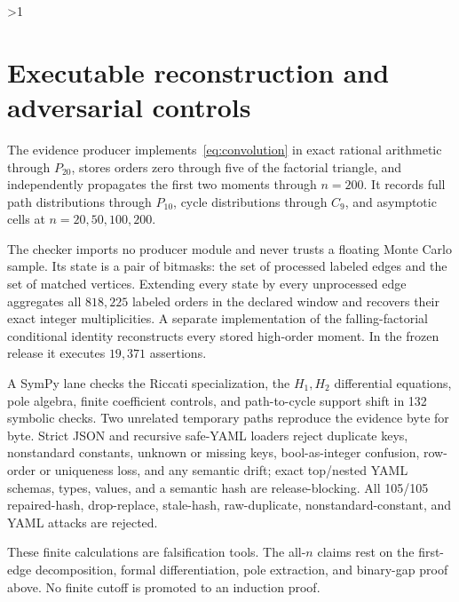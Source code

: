 \documentclass[10pt]{article}
\providecommand{\CRevisionRound}{2}
\begin{document}
\ifnum\CRevisionRound>1
\section{Executable reconstruction and adversarial controls}
The evidence producer implements~\eqref{eq:convolution} in exact rational
arithmetic through $P_{20}$, stores orders zero through five of the factorial
triangle, and independently propagates the first two moments through $n=200$.
It records full path distributions through $P_{10}$, cycle distributions
through $C_9$, and asymptotic cells at $n=20,50,100,200$.

The checker imports no producer module and never trusts a floating Monte Carlo
sample.  Its state is a pair of bitmasks: the set of processed labeled edges
and the set of matched vertices.  Extending every state by every unprocessed
edge aggregates all $818{,}225$ labeled orders in the declared window and
recovers their exact integer multiplicities.  A separate implementation of
the falling-factorial conditional identity reconstructs every stored
high-order moment.  In the frozen release it executes $19{,}371$ assertions.

A SymPy lane checks the Riccati specialization, the $H_1,H_2$ differential
equations, pole algebra, finite coefficient controls, and path-to-cycle support
shift in 132 symbolic checks.  Two unrelated temporary paths reproduce the
evidence byte for byte.  Strict JSON and recursive safe-YAML loaders reject
duplicate keys, nonstandard constants, unknown or missing keys,
bool-as-integer confusion, row-order or uniqueness loss, and any semantic
drift; exact top/nested YAML schemas, types, values, and a semantic hash are
release-blocking.  All 105/105 repaired-hash, drop-replace, stale-hash,
raw-duplicate, nonstandard-constant, and YAML attacks are rejected.

These finite calculations are falsification tools.  The all-$n$ claims rest on
the first-edge decomposition, formal differentiation, pole extraction, and
binary-gap proof above.  No finite cutoff is promoted to an induction proof.
\end{document}
